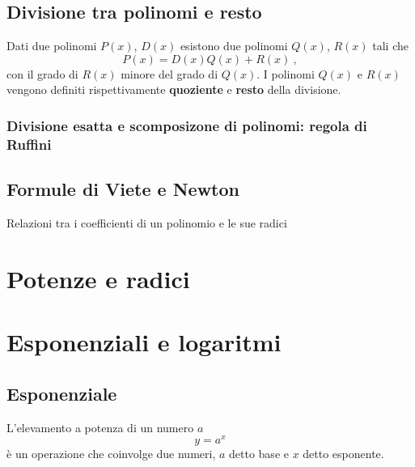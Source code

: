 \subsection{Divisione tra polinomi e resto}
\begin{definition}
    Dati due polinomi $P(x)$, $D(x)$ esistono due polinomi $Q(x)$, $R(x)$ tali che
    \begin{equation}
        P(x) = D(x) Q(x) + R(x) \ ,
    \end{equation}
    con il grado di $R(x)$ minore del grado di $Q(x)$. I polinomi $Q(x)$ e $R(x)$ vengono definiti rispettivamente \textbf{quoziente} e \textbf{resto} della divisione.
\end{definition}

\subsubsection{Divisione esatta e scomposizone di polinomi: regola di Ruffini}

\subsection{Formule di Viete e Newton}
{\color{red} Relazioni tra i coefficienti di un polinomio e le sue radici}


\section{Potenze e radici}
\begin{definition}
\end{definition}

\section{Esponenziali e logaritmi}
\subsection{Esponenziale}
\begin{definition}[Esponenziale] L'elevamento a potenza di un numero $a$
\begin{equation}
   y = a^x
\end{equation}
è un operazione che coinvolge due numeri, $a$ detto base e $x$ detto esponente.
\end{definition}
